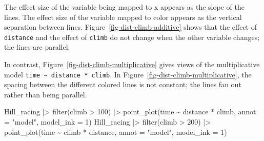 \documentclass[
  letterpaper,
  DIV=11,
  numbers=noendperiod,
  oneside]{scrartcl}
\newenvironment{Shaded}{\begin{snugshade}}{\end{snugshade}}
\newcommand{\AttributeTok}[1]{\textcolor[rgb]{0.40,0.45,0.13}{#1}}
\newcommand{\DecValTok}[1]{\textcolor[rgb]{0.68,0.00,0.00}{#1}}
\newcommand{\FunctionTok}[1]{\textcolor[rgb]{0.28,0.35,0.67}{#1}}
\newcommand{\NormalTok}[1]{\textcolor[rgb]{0.00,0.23,0.31}{#1}}
\newcommand{\SpecialCharTok}[1]{\textcolor[rgb]{0.37,0.37,0.37}{#1}}
\newcommand{\StringTok}[1]{\textcolor[rgb]{0.13,0.47,0.30}{#1}}
\begin{document}
The effect size of the variable being mapped to x appears as the slope
of the lines. The effect size of the variable mapped to color appears as
the vertical separation between lines.
Figure~\ref{fig-dist-climb-additive} shows that the effect of
\texttt{distance} and the effect of \texttt{climb} do not change when
the other variable changes; the lines are parallel.

In contrast, Figure~\ref{fig-dist-climb-multiplicative} gives views of
the multiplicative model
\texttt{time\ \textasciitilde{}\ distance\ *\ climb}. In
Figure~\ref{fig-dist-climb-multiplicative}, the spacing between the
different colored lines is not constant; the lines fan out rather than
being parallel.

\begin{Shaded}
\begin{Highlighting}[]
\NormalTok{Hill\_racing }\SpecialCharTok{|\textgreater{}} \FunctionTok{filter}\NormalTok{(climb }\SpecialCharTok{\textgreater{}} \DecValTok{100}\NormalTok{) }\SpecialCharTok{|\textgreater{}}
  \FunctionTok{point\_plot}\NormalTok{(time }\SpecialCharTok{\textasciitilde{}}\NormalTok{ distance }\SpecialCharTok{*}\NormalTok{ climb, }\AttributeTok{annot =} \StringTok{"model"}\NormalTok{,}
             \AttributeTok{model\_ink =} \DecValTok{1}\NormalTok{)}
\NormalTok{Hill\_racing }\SpecialCharTok{|\textgreater{}} \FunctionTok{filter}\NormalTok{(climb }\SpecialCharTok{\textgreater{}} \DecValTok{200}\NormalTok{) }\SpecialCharTok{|\textgreater{}}
  \FunctionTok{point\_plot}\NormalTok{(time }\SpecialCharTok{\textasciitilde{}}\NormalTok{ climb }\SpecialCharTok{*}\NormalTok{ distance, }\AttributeTok{annot =} \StringTok{"model"}\NormalTok{,}
             \AttributeTok{model\_ink =} \DecValTok{1}\NormalTok{)}
\end{Highlighting}
\end{Shaded}
\end{document}
